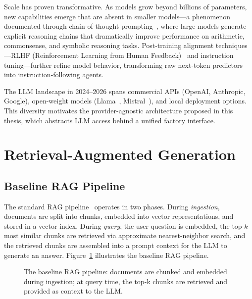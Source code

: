 Scale has proven transformative. As models grow beyond billions of parameters, new capabilities emerge that are absent in smaller models---a phenomenon documented through chain-of-thought prompting~\cite{wei2022chainofthoughtpromptingelicitsreasoning}, where large models generate explicit reasoning chains that dramatically improve performance on arithmetic, commonsense, and symbolic reasoning tasks. Post-training alignment techniques---RLHF (Reinforcement Learning from Human Feedback)~\cite{ouyang2022traininglanguagemodelsfollow} and instruction tuning---further refine model behavior, transforming raw next-token predictors into instruction-following agents.

The LLM landscape in 2024--2026 spans commercial APIs (OpenAI, Anthropic, Google), open-weight models (Llama~\cite{touvron2023llamaopenefficientfoundation}, Mistral~\cite{jiang2023mistral7b}), and local deployment options. This diversity motivates the provider-agnostic architecture proposed in this thesis, which abstracts LLM access behind a unified factory interface.

\section{Retrieval-Augmented Generation}
\label{sec:rw:rag}

\subsection{Baseline RAG Pipeline}
\label{sec:rw:baseline_rag}

The standard RAG pipeline~\cite{gao2024retrievalaugmentedgenerationlargelanguage} operates in two phases. During \emph{ingestion}, documents are split into chunks, embedded into vector representations, and stored in a vector index. During \emph{query}, the user question is embedded, the top-$k$ most similar chunks are retrieved via approximate nearest-neighbor search, and the retrieved chunks are assembled into a prompt context for the LLM to generate an answer. Figure~\ref{fig:rag_pipeline} illustrates the baseline RAG pipeline.

\begin{figure}[htbp]
\centering
{}
\caption{The baseline RAG pipeline: documents are chunked and embedded during ingestion; at query time, the top-k chunks are retrieved and provided as context to the LLM.}
\label{fig:rag_pipeline}
\end{figure}

